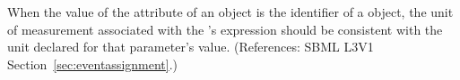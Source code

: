 When the value of the attribute  of an \EventAssignment
object is the identifier of a \Parameter object, the unit of measurement
associated with the \EventAssignment's  expression should be
consistent with the unit declared for that parameter's value.  (References:
SBML L3V1 Section~\ref{sec:eventassignment}.)
